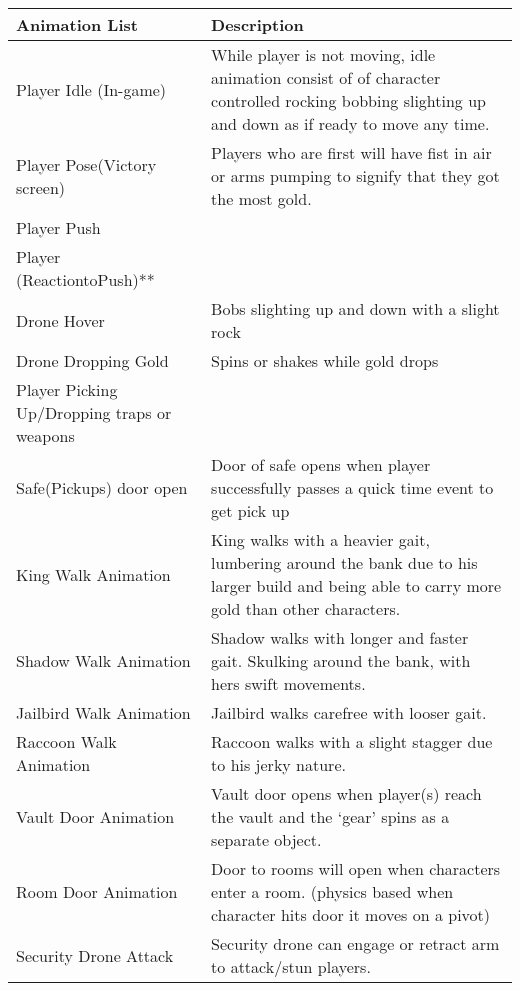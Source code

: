 \documentclass[10pt]{report}
\begin{document}
\begin{center} %
    \begin{tabular}{| p{.45\linewidth} | p{.45\linewidth} |}
        \hline
        \textbf{Animation List}      &   \textbf{Description}     \\ \hline
        Player Idle (In-game)   &        While player is not moving, idle animation consist of of character controlled rocking bobbing slighting up and down as if ready to move any time.  \\ \hline
        Player Pose(Victory screen) &        Players who are first will have fist in air or arms pumping to signify that they got the most gold.    \\ \hline
        Player Push &               \\ \hline
        Player (ReactiontoPush)**   &               \\ \hline
        Drone Hover &        Bobs slighting up and down with a slight rock  \\ \hline
        Drone Dropping Gold &        Spins or shakes while gold drops   \\ \hline
        Player Picking Up/Dropping traps or weapons &               \\ \hline
        Safe(Pickups) door open &        Door of safe opens when player successfully passes a quick time event to get pick up   \\ \hline
        King Walk Animation &        King walks with a heavier gait, lumbering around the bank due to his larger build and being able to carry more gold than other characters. \\ \hline
        Shadow Walk Animation   &        Shadow walks with longer and faster gait. Skulking around the bank, with hers swift movements. \\ \hline
        Jailbird Walk Animation &        Jailbird walks carefree with looser gait.  \\ \hline
        Raccoon Walk Animation  &        Raccoon walks with a slight stagger due to his jerky nature.   \\ \hline
        Vault Door Animation    &        Vault door opens when player(s) reach the vault and the ‘gear’ spins as a separate object. \\ \hline
        Room Door Animation &        Door to rooms will open when characters enter a room. (physics based when character hits door it moves on a pivot) \\ \hline
        Security Drone Attack   &        Security drone can engage or retract arm to attack/stun players.   \\ \hline

\end{tabular}
\end{center}
\end{document}
